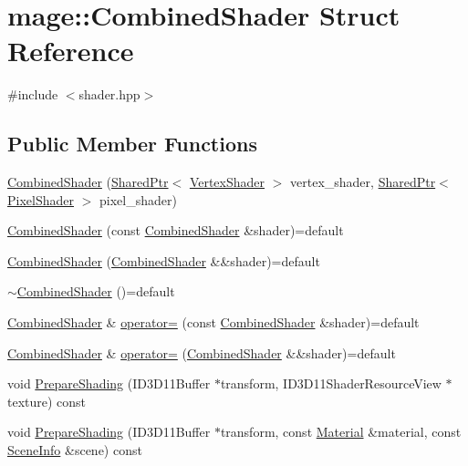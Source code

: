 \hypertarget{structmage_1_1_combined_shader}{}\section{mage\+:\+:Combined\+Shader Struct Reference}
\label{structmage_1_1_combined_shader}


{\ttfamily \#include $<$shader.\+hpp$>$}

\subsection*{Public Member Functions}
\begin{DoxyCompactItemize}
\item 
\hyperlink{structmage_1_1_combined_shader_ab9d6ce4dc9ed2602b19729ee8d126f61}{Combined\+Shader} (\hyperlink{namespacemage_a1e01ae66713838a7a67d30e44c67703e}{Shared\+Ptr}$<$ \hyperlink{classmage_1_1_vertex_shader}{Vertex\+Shader} $>$ vertex\+\_\+shader, \hyperlink{namespacemage_a1e01ae66713838a7a67d30e44c67703e}{Shared\+Ptr}$<$ \hyperlink{classmage_1_1_pixel_shader}{Pixel\+Shader} $>$ pixel\+\_\+shader)
\item 
\hyperlink{structmage_1_1_combined_shader_afc4a237b78efe6b13d6e569ede301b62}{Combined\+Shader} (const \hyperlink{structmage_1_1_combined_shader}{Combined\+Shader} \&shader)=default
\item 
\hyperlink{structmage_1_1_combined_shader_a74c1a44f6b1ec3cc1734b18b337441d3}{Combined\+Shader} (\hyperlink{structmage_1_1_combined_shader}{Combined\+Shader} \&\&shader)=default
\item 
\hyperlink{structmage_1_1_combined_shader_a6b1767d2525724f2f9120df87253973e}{$\sim$\+Combined\+Shader} ()=default
\item 
\hyperlink{structmage_1_1_combined_shader}{Combined\+Shader} \& \hyperlink{structmage_1_1_combined_shader_a14859fb597c07309fd269b56af373c02}{operator=} (const \hyperlink{structmage_1_1_combined_shader}{Combined\+Shader} \&shader)=default
\item 
\hyperlink{structmage_1_1_combined_shader}{Combined\+Shader} \& \hyperlink{structmage_1_1_combined_shader_ad05cf0e2c4f0cd7d37ad5be971aefd1b}{operator=} (\hyperlink{structmage_1_1_combined_shader}{Combined\+Shader} \&\&shader)=default
\item 
void \hyperlink{structmage_1_1_combined_shader_a5eb9372fd492ab61b9b536ca47ce5176}{Prepare\+Shading} (I\+D3\+D11\+Buffer $\ast$transform, I\+D3\+D11\+Shader\+Resource\+View $\ast$texture) const
\item 
void \hyperlink{structmage_1_1_combined_shader_a5fd0f6c2f262ae53bd019cad02c28de1}{Prepare\+Shading} (I\+D3\+D11\+Buffer $\ast$transform, const \hyperlink{structmage_1_1_material}{Material} \&material, const \hyperlink{structmage_1_1_scene_info}{Scene\+Info} \&scene) const
\end{DoxyCompactItemize}
